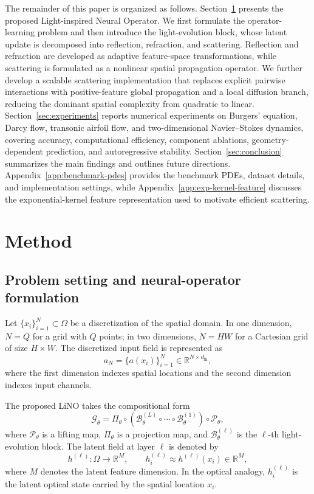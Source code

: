 \documentclass{article}
\newcommand{\R}{\mathbb{R}}
\newcommand{\cG}{\mathcal{G}}
\newcommand{\cP}{\mathcal{P}}
\newcommand{\cB}{\mathcal{B}}
\begin{document}
The remainder of this paper is organized as follows. 
Section~\ref{sec:method} presents the proposed Light-inspired Neural Operator. 
We first formulate the operator-learning problem and then introduce the light-evolution block, whose latent update is decomposed into reflection, refraction, and scattering. 
Reflection and refraction are developed as adaptive feature-space transformations, while scattering is formulated as a nonlinear spatial propagation operator. 
We further develop a scalable scattering implementation that replaces explicit pairwise interactions with positive-feature global propagation and a local diffusion branch, reducing the dominant spatial complexity from quadratic to linear.
Section~\ref{sec:experiments} reports numerical experiments on Burgers' equation, Darcy flow, transonic airfoil flow, and two-dimensional Navier--Stokes dynamics, covering accuracy, computational efficiency, component ablations, geometry-dependent prediction, and autoregressive stability. 
Section~\ref{sec:conclusion} summarizes the main findings and outlines future directions. 
Appendix~\ref{app:benchmark-pdes} provides the benchmark PDEs, dataset details, and implementation settings, while Appendix~\ref{app:exp-kernel-feature} discusses the exponential-kernel feature representation used to motivate efficient scattering.

\section{Method}
\label{sec:method}
\subsection{Problem setting and neural-operator formulation}

Let $\{x_i\}_{i=1}^{N}\subset\Omega$ be a discretization of the spatial domain. 
In one dimension, $N=Q$ for a grid with $Q$ points; in two dimensions, 
$N=HW$ for a Cartesian grid of size $H\times W$. 
The discretized input field is represented as
\begin{equation}
    a_N = \{a(x_i)\}_{i=1}^{N} \in \R^{N\times d_{\mathrm{in}}},
\end{equation}
where the first dimension indexes spatial locations and the second dimension indexes input channels. 

The proposed LiNO takes the compositional form
\begin{equation}
    \cG_\theta
    =
    \Pi_\theta \circ
    \left(\cB_\theta^{(L)}\circ\cdots\circ\cB_\theta^{(1)}\right)
    \circ \cP_\theta,
    \label{eq:global-lightno}
\end{equation}
where $\cP_\theta$ is a lifting map, $\Pi_\theta$ is a projection map, and $\cB_\theta^{(\ell)}$ is the $\ell$-th light-evolution block. The latent field at layer $\ell$ is denoted by
\begin{equation}
    h^{(\ell)}:\Omega\to\R^M, \qquad
    h_i^{(\ell)} \approx h^{(\ell)}(x_i)\in\R^M,
\end{equation}
where $M$ denotes the latent feature dimension.
In the optical analogy, $h_i^{(\ell)}$ is the latent optical state carried by the spatial location $x_i$.
\end{document}

